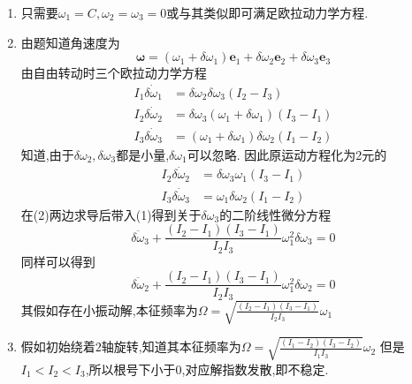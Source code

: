 \begin{solution}
    \begin{enumerate}[label=(\arabic*)]
    \item 只需要$\omega_1=C,\omega_2=\omega_3=0$或与其类似即可满足欧拉动力学方程.

    \item 由题知道角速度为
    $$\boldsymbol{\omega}=(\omega_1+\delta\omega_1)\textbf{e}_1+\delta\omega_2\textbf{e}_2+\delta\omega_3\textbf{e}_3$$
    由自由转动时三个欧拉动力学方程
    \begin{align*}
        I_1\dot{\delta\omega_1}&=\delta\omega_2\delta\omega_3(I_2-I_3)\\
        I_2\dot{\delta\omega_2}&=\delta\omega_3(\omega_1+\delta\omega_1)(I_3-I_1)\\
        I_3\dot{\delta\omega_3}&=(\omega_1+\delta\omega_1)\delta\omega_2(I_1-I_2)
    \end{align*}
    知道,由于$\delta\omega_2,\delta\omega_3$都是小量,$\delta\omega_1$可以忽略.
    因此原运动方程化为2元的
    \begin{align}
        I_2\dot{\delta\omega_2}&=\delta\omega_3\omega_1(I_3-I_1)\\
        I_3\dot{\delta\omega_3}&=\omega_1\delta\omega_2(I_1-I_2)
    \end{align}
    在(2)两边求导后带入(1)得到关于$\delta\omega_3$的二阶线性微分方程
    $$\ddot{\delta\omega_3}+\frac{(I_2-I_1)(I_3-I_1)}{I_2I_3}\omega_1^2\delta\omega_3=0$$
    同样可以得到
    $$\ddot{\delta\omega_2}+\frac{(I_2-I_1)(I_3-I_1)}{I_2I_3}\omega_1^2\delta\omega_2=0$$
    其假如存在小振动解,本征频率为$\Omega=\sqrt{\frac{(I_2-I_1)(I_3-I_1)}{I_2I_3}}\omega_1$

    \item 假如初始绕着$2$轴旋转,知道其本征频率为$\Omega=\sqrt{\frac{(I_1-I_2)(I_3-I_2)}{I_1I_3}}\omega_2$
    但是$I_1<I_2<I_3$,所以根号下小于$0$,对应解指数发散,即不稳定.
    \end{enumerate}    
\end{solution}

